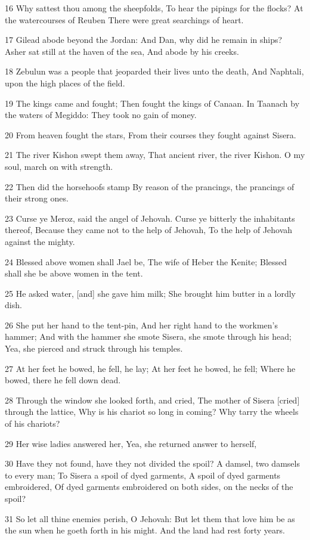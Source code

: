 \par 16 Why sattest thou among the sheepfolds, To hear the pipings for the flocks? At the watercourses of Reuben There were great searchings of heart.
\par 17 Gilead abode beyond the Jordan: And Dan, why did he remain in ships? Asher sat still at the haven of the sea, And abode by his creeks.
\par 18 Zebulun was a people that jeoparded their lives unto the death, And Naphtali, upon the high places of the field.
\par 19 The kings came and fought; Then fought the kings of Canaan. In Taanach by the waters of Megiddo: They took no gain of money.
\par 20 From heaven fought the stars, From their courses they fought against Sisera.
\par 21 The river Kishon swept them away, That ancient river, the river Kishon. O my soul, march on with strength.
\par 22 Then did the horsehoofs stamp By reason of the prancings, the prancings of their strong ones.
\par 23 Curse ye Meroz, said the angel of Jehovah. Curse ye bitterly the inhabitants thereof, Because they came not to the help of Jehovah, To the help of Jehovah against the mighty.
\par 24 Blessed above women shall Jael be, The wife of Heber the Kenite; Blessed shall she be above women in the tent.
\par 25 He asked water, [and] she gave him milk; She brought him butter in a lordly dish.
\par 26 She put her hand to the tent-pin, And her right hand to the workmen's hammer; And with the hammer she smote Sisera, she smote through his head; Yea, she pierced and struck through his temples.
\par 27 At her feet he bowed, he fell, he lay; At her feet he bowed, he fell; Where he bowed, there he fell down dead.
\par 28 Through the window she looked forth, and cried, The mother of Sisera [cried] through the lattice, Why is his chariot so long in coming? Why tarry the wheels of his chariots?
\par 29 Her wise ladies answered her, Yea, she returned answer to herself,
\par 30 Have they not found, have they not divided the spoil? A damsel, two damsels to every man; To Sisera a spoil of dyed garments, A spoil of dyed garments embroidered, Of dyed garments embroidered on both sides, on the necks of the spoil?
\par 31 So let all thine enemies perish, O Jehovah: But let them that love him be as the sun when he goeth forth in his might. And the land had rest forty years.


